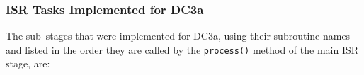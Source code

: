 

\subsubsection{ISR Tasks Implemented for DC3a}

The sub--stages that were implemented for DC3a, using their subroutine
names and listed in the order they are called by the {\tt process()}
method of the main ISR stage, are:

